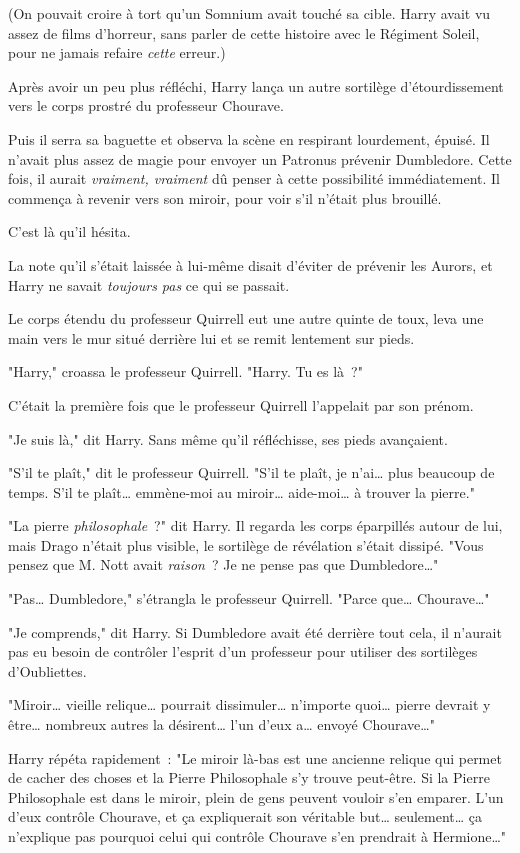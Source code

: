 (On pouvait croire à tort qu'un Somnium avait touché sa cible. Harry avait vu assez de films d'horreur, sans parler de cette histoire avec le Régiment Soleil, pour ne jamais refaire \emph{cette} erreur.)

Après avoir un peu plus réfléchi, Harry lança un autre sortilège d'étourdissement vers le corps prostré du professeur Chourave.

Puis il serra sa baguette et observa la scène en respirant lourdement, épuisé. Il n'avait plus assez de magie pour envoyer un Patronus prévenir Dumbledore. Cette fois, il aurait \emph{vraiment, vraiment} dû penser à cette possibilité immédiatement. Il commença à revenir vers son miroir, pour voir s'il n'était plus brouillé.

C'est là qu'il hésita.

La note qu'il s'était laissée à lui-même disait d'éviter de prévenir les Aurors, et Harry ne savait \emph{toujours pas} ce qui se passait.

Le corps étendu du professeur Quirrell eut une autre quinte de toux, leva une main vers le mur situé derrière lui et se remit lentement sur pieds.

"Harry," croassa le professeur Quirrell. "Harry. Tu es là~?"

C'était la première fois que le professeur Quirrell l'appelait par son prénom.

"Je suis là," dit Harry. Sans même qu'il réfléchisse, ses pieds avançaient.

"S'il te plaît," dit le professeur Quirrell. "S'il te plaît, je n'ai… plus beaucoup de temps. S'il te plaît… emmène-moi au miroir… aide-moi… à trouver la pierre."

"La pierre \emph{philosophale}~?" dit Harry. Il regarda les corps éparpillés autour de lui, mais Drago n'était plus visible, le sortilège de révélation s'était dissipé. "Vous pensez que M. Nott avait \emph{raison}~? Je ne pense pas que Dumbledore…"

"Pas… Dumbledore," s'étrangla le professeur Quirrell. "Parce que… Chourave…"

"Je comprends," dit Harry. Si Dumbledore avait été derrière tout cela, il n'aurait pas eu besoin de contrôler l'esprit d'un professeur pour utiliser des sortilèges d'Oubliettes.

"Miroir… vieille relique… pourrait dissimuler… n'importe quoi… pierre devrait y être… nombreux autres la désirent… l'un d'eux a… envoyé Chourave…"

Harry répéta rapidement~: "Le miroir là-bas est une ancienne relique qui permet de cacher des choses et la Pierre Philosophale s'y trouve peut-être. Si la Pierre Philosophale est dans le miroir, plein de gens peuvent vouloir s'en emparer. L'un d'eux contrôle Chourave, et ça expliquerait son véritable but… seulement… ça n'explique pas pourquoi celui qui contrôle Chourave s'en prendrait à Hermione…"

